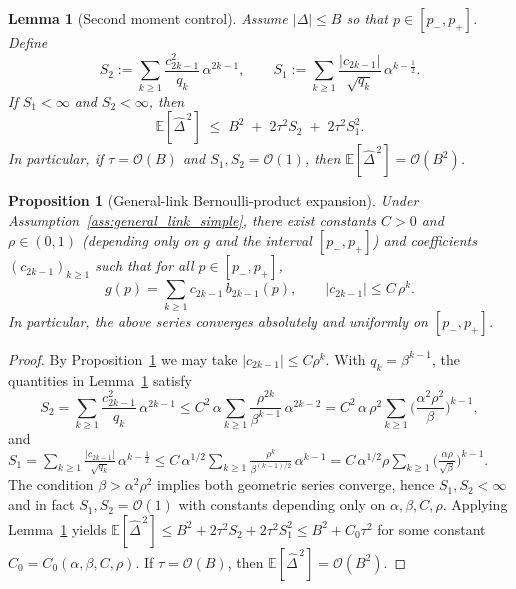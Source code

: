 \documentclass[10pt,a4paper]{amsart}
\newtheorem{proposition}{Proposition}
\newtheorem{lemma}{Lemma}
\newcommand{\E}{\mathbb{E}}
\begin{document}
\begin{lemma}[Second moment control]\label{lem:moment_simple}
Assume $|\Delta|\le B$ so that $p\in[p_-,p_+]$.
Define
$$
S_2:=\sum_{k\ge1}\frac{c_{2k-1}^2}{q_k}\,\alpha^{2k-1},
\qquad
S_1:=\sum_{k\ge1}\frac{|c_{2k-1}|}{\sqrt{q_k}}\,\alpha^{k-\frac12}.
$$
If $S_1<\infty$ and $S_2<\infty$, then
$$
\E[\widehat\Delta^{\,2}]
\;\le\;
B^2 \;+\; 2\tau^2 S_2 \;+\; 2\tau^2 S_1^2.
$$
In particular, if $\tau=\mathcal O(B)$ and $S_1,S_2=\mathcal O(1)$, then $\E[\widehat\Delta^{\,2}]=\mathcal O(B^2)$.
\end{lemma}

\begin{proposition}[General-link Bernoulli-product expansion]\label{prop:general_link_simple}
Under Assumption~\ref{ass:general_link_simple}, there exist constants $C>0$ and $\rho\in(0,1)$
(depending only on $g$ and the interval $[p_-,p_+]$) and coefficients $(c_{2k-1})_{k\ge1}$ such that for all
$p\in[p_-,p_+]$,
$$
g(p)=\sum_{k\ge1} c_{2k-1}\,b_{2k-1}(p),
\qquad
|c_{2k-1}|\le C\,\rho^k.
$$
In particular, the above series converges absolutely and uniformly on $[p_-,p_+]$.
\end{proposition}

\begin{proof}
By Proposition~\ref{prop:general_link_simple} we may take $|c_{2k-1}|\le C\rho^k$.
With $q_k=\beta^{k-1}$, the quantities in Lemma~\ref{lem:moment_simple} satisfy
\[
S_2
=
\sum_{k\ge1}\frac{c_{2k-1}^2}{q_k}\,\alpha^{2k-1}
\le
C^2\,\alpha\sum_{k\ge1}\frac{\rho^{2k}}{\beta^{k-1}}\,\alpha^{2k-2}
=
C^2\,\alpha\,\rho^2\sum_{k\ge1}\Big(\frac{\alpha^2\rho^{2}}{\beta}\Big)^{k-1},
\]
and
$
S_1
=
\sum_{k\ge1}\frac{|c_{2k-1}|}{\sqrt{q_k}}\,\alpha^{k-\frac12}
\le
C\,\alpha^{1/2}\sum_{k\ge1}\frac{\rho^{k}}{\beta^{(k-1)/2}}\,\alpha^{k-1}
=
C\,\alpha^{1/2}\rho\sum_{k\ge1}\Big(\frac{\alpha\rho}{\sqrt{\beta}}\Big)^{k-1}.$
The condition $\beta>\alpha^2\rho^{2}$ implies both geometric series converge, hence $S_1,S_2<\infty$ and in fact
$S_1,S_2=\mathcal O(1)$ with constants depending only on $\alpha,\beta,C,\rho$. Applying Lemma~\ref{lem:moment_simple} yields
$
\E[\widehat\Delta^{\,2}]
\le
B^2 + 2\tau^2 S_2 + 2\tau^2 S_1^2
\le
B^2 + C_0\tau^2
$
for some constant $C_0=C_0(\alpha,\beta,C,\rho)$.
If $\tau=\mathcal O(B)$, then $\E[\widehat\Delta^{\,2}]=\mathcal O(B^2)$.
\end{proof}
\end{document}
